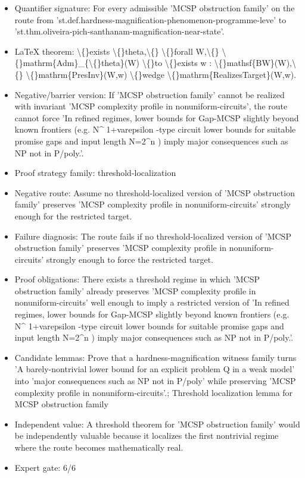 \documentclass[11pt]{article}
\begin{document}
\begin{itemize}
\item Quantifier signature: For every admissible 'MCSP obstruction family' on the route from 'st.def.hardness-magnification-phenomenon-programme-leve' to 'st.thm.oliveira-pich-santhanam-magnification-near-state'.
\item LaTeX theorem: \textbackslash\{\}exists \textbackslash\{\}theta,\textbackslash\{\} \textbackslash\{\}forall W,\textbackslash\{\} \textbackslash\{\}mathrm\{Adm\}\_\{\textbackslash\{\}theta\}(W) \textbackslash\{\}to \textbackslash\{\}exists w : \textbackslash\{\}mathsf\{BW\}(W),\textbackslash\{\} \textbackslash\{\}mathrm\{PresInv\}(W,w) \textbackslash\{\}wedge \textbackslash\{\}mathrm\{RealizesTarget\}(W,w).
\item Negative/barrier version: If 'MCSP obstruction family' cannot be realized with invariant 'MCSP complexity profile in nonuniform-circuits', the route cannot force 'In refined regimes, lower bounds for Gap-MCSP slightly beyond known frontiers (e.g. N\textasciicircum{} 1+varepsilon -type circuit lower bounds for suitable promise gaps and input length N=2\textasciicircum{}n ) imply major consequences such as NP not in P/poly.'.
\item Proof strategy family: threshold-localization
\item Negative route: Assume no threshold-localized version of 'MCSP obstruction family' preserves 'MCSP complexity profile in nonuniform-circuits' strongly enough for the restricted target.
\item Failure diagnosis: The route fails if no threshold-localized version of 'MCSP obstruction family' preserves 'MCSP complexity profile in nonuniform-circuits' strongly enough to force the restricted target.
\item Proof obligations: There exists a threshold regime in which 'MCSP obstruction family' already preserves 'MCSP complexity profile in nonuniform-circuits' well enough to imply a restricted version of 'In refined regimes, lower bounds for Gap-MCSP slightly beyond known frontiers (e.g. N\textasciicircum{} 1+varepsilon -type circuit lower bounds for suitable promise gaps and input length N=2\textasciicircum{}n ) imply major consequences such as NP not in P/poly.'.
\item Candidate lemmas: Prove that a hardness-magnification witness family turns 'A barely-nontrivial lower bound for an explicit problem Q in a weak model' into 'major consequences such as NP not in P/poly' while preserving 'MCSP complexity profile in nonuniform-circuits'.; Threshold localization lemma for MCSP obstruction family
\item Independent value: A threshold theorem for 'MCSP obstruction family' would be independently valuable because it localizes the first nontrivial regime where the route becomes mathematically real.
\item Expert gate: 6/6
\end{itemize}
\end{document}
